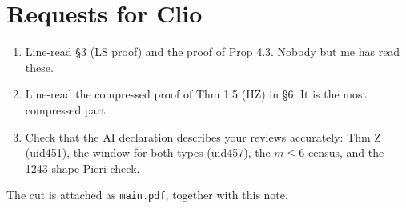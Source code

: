 \documentclass[11pt]{article}
\begin{document}
\section*{Requests for Clio}
\begin{enumerate}
\item Line-read \S3 (LS proof) and the proof of Prop 4.3. Nobody but me has read these.
\item Line-read the compressed proof of Thm 1.5 (HZ) in \S6. It is the most compressed part.
\item Check that the AI declaration describes your reviews accurately: Thm Z (uid451), the window for both types (uid457), the $m\le 6$ census, and the 1243-shape Pieri check.
\end{enumerate}

\noindent The cut is attached as \texttt{main.pdf}, together with this note.
\end{document}
